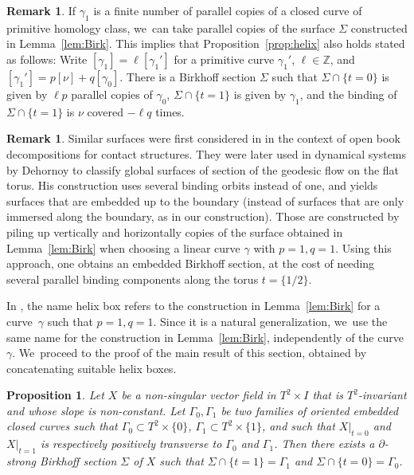 \documentclass[10pt]{amsart}
\newtheorem{prop}[theorem]{Proposition}
\theoremstyle{definition}
\newtheorem{Remark}[theorem]{Remark}
\begin{document}
\begin{Remark}\label{rem:Multcurv}
If $\gamma_1$ is a finite number of parallel copies of a closed curve of primitive homology class, we~can take parallel copies of the surface $\Sigma$ constructed in Lemma~\ref{lem:Birk}. This implies that Proposition~\ref{prop:helix} also holds stated as follows: Write $[\gamma_1]=\ell [\gamma_1']$ for a primitive curve $\gamma_1'$, $\ell \in \mathbb{Z}$, and $[\gamma_1']=p[\nu] + q [\gamma_0]$. There is a Birkhoff section $\Sigma$ such that $\Sigma\cap \{t=0\}$ is given by $\ell p$ parallel copies of $\gamma_0$, $\Sigma\cap \{t=1\}$ is given by $\gamma_1$, and the binding of $\Sigma\cap \{t=1\}$ is $\nu$ covered $-\ell q$ times.
\end{Remark}

\begin{Remark}\label{rem:embDeh}
Similar surfaces were first considered in \cite{VHM} in the context of open book decompositions for contact structures. They were later used in dynamical systems by Dehornoy \cite{Deh, Deh2} to classify global surfaces of section of the geodesic flow on the flat torus. His construction uses several binding orbits instead of one, and yields surfaces that are embedded up to the boundary (instead of surfaces that are only immersed along the boundary, as in our construction). Those are constructed by piling up vertically and horizontally copies of the surface obtained in Lemma~\ref{lem:Birk} when choosing a linear curve $\gamma$ with $p=1,q=1$. Using this approach, one obtains an embedded Birkhoff section, at the cost of needing several parallel binding components along the torus $t=\{1/2\}$.

In \cite{Deh, Deh2}, the name helix box refers to the construction in Lemma~\ref{lem:Birk} for a curve~$\gamma$ such that $p=1,q=1$. Since it is a natural generalization, we~use the same name for the construction in Lemma~\ref{lem:Birk}, independently of the curve $\gamma$. We~proceed to the proof of the main result of this section, obtained by concatenating suitable helix boxes.
\end{Remark}

\begin{prop}\label{prop:BirkT2}
Let $X$ be a non-singular vector field in $T^2\times I$ that is $T^2$-invariant and whose slope is non-constant. Let $\Gamma_0,\Gamma_1$ be two families of oriented embedded closed curves such that $\Gamma_0 \subset T^2\times \{0\}$, $\Gamma_1\subset T^2\times \{1\}$, and such that $X|_{t=0}$ and $X|_{t=1}$ is respectively positively transverse to $\Gamma_0$ and $\Gamma_1$. Then there exists a $\partial$-strong Birkhoff section $\Sigma$ of $X$ such that $\Sigma \cap \{t=1\}=\Gamma_1$ and $\Sigma \cap \{t=0\}=\Gamma_0$.
\end{prop}
\end{document}
